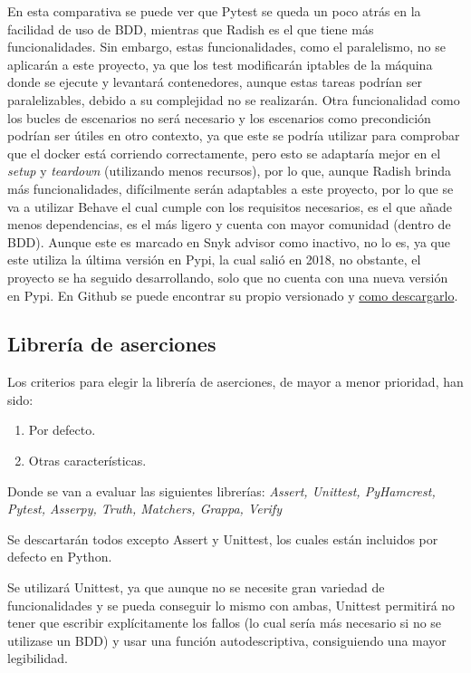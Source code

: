 En esta comparativa se puede ver que Pytest se queda un poco atrás en la facilidad de uso de BDD, mientras que Radish es el que tiene más funcionalidades. Sin embargo, estas funcionalidades, como el paralelismo, no se aplicarán a este proyecto, ya que los test modificarán iptables de la máquina donde se ejecute y levantará contenedores, aunque estas tareas podrían ser paralelizables, debido a su complejidad no se realizarán. Otra funcionalidad como los bucles de escenarios no será necesario y los escenarios como precondición podrían ser útiles en otro contexto, ya que este se podría utilizar para comprobar que el docker está corriendo correctamente, pero esto se adaptaría mejor en el \textit{setup} y \textit{teardown} (utilizando menos recursos), por lo que, aunque Radish brinda más funcionalidades, difícilmente serán adaptables a este proyecto, por lo que se va a utilizar Behave el cual cumple con los requisitos necesarios, es el que añade menos dependencias, es el más ligero y cuenta con mayor comunidad (dentro de BDD). Aunque este es marcado en Snyk advisor\cite{snyk} como inactivo, no lo es, ya que este utiliza la última versión en Pypi, la cual salió en 2018, no obstante, el proyecto se ha seguido desarrollando, solo que no cuenta con una nueva versión en Pypi. En Github se puede encontrar su propio versionado y \href{https://behave.readthedocs.io/en/latest/install/#using-the-github-repository}{como descargarlo}.


\subsection{Librería de aserciones}
Los criterios para elegir la librería de aserciones, de mayor a menor prioridad, han sido:

\begin{enumerate}
    \item Por defecto.
    \item Otras características.
\end{enumerate}

Donde se van a evaluar las siguientes librerías: \textit{Assert, Unittest, PyHamcrest, Pytest, Asserpy, Truth, Matchers, Grappa, Verify}

Se descartarán todos excepto Assert y Unittest, los cuales están incluidos por defecto en Python.

Se utilizará Unittest, ya que aunque no se necesite gran variedad de funcionalidades y se pueda conseguir lo mismo con ambas, Unittest permitirá no tener que escribir explícitamente los fallos (lo cual sería más necesario si no se utilizase un BDD) y usar una función autodescriptiva, consiguiendo una mayor legibilidad.

